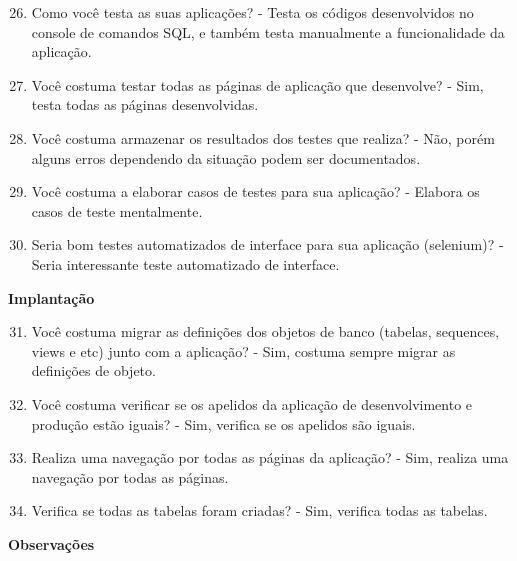 \begin{apendicesenv}
\begin{enumerate}
	\setcounter{enumi}{25}
	\item Como você testa as suas aplicações?\newline
	- Testa os códigos desenvolvidos no console de comandos SQL, e também testa manualmente a funcionalidade da aplicação.
	\item Você costuma testar todas as páginas de aplicação que desenvolve?\newline
	- Sim, testa todas as páginas desenvolvidas.
	\item Você costuma armazenar os resultados dos testes que realiza?\newline
	- Não, porém alguns erros dependendo da situação podem ser documentados.
	\item Você costuma a elaborar casos de testes para sua aplicação?\newline
	- Elabora os casos de teste mentalmente.
	\item Seria bom testes automatizados de interface para sua aplicação (selenium)?\newline
	- Seria interessante teste automatizado de interface.
\end{enumerate}

\textbf{Implantação}

\begin{enumerate}
	\setcounter{enumi}{30}
	\item Você costuma migrar as definições dos objetos de banco (tabelas, sequences, views e
	etc) junto com a aplicação?\newline
	- Sim, costuma sempre migrar as definições de objeto.
	\item Você costuma verificar se os apelidos da aplicação de desenvolvimento e produção
	estão iguais?\newline
	- Sim, verifica se os apelidos são iguais.
	\item Realiza uma navegação por todas as páginas da aplicação?\newline
	- Sim, realiza uma navegação por todas as páginas.
	\item Verifica se todas as tabelas foram criadas?\newline
	- Sim, verifica todas as tabelas.
\end{enumerate}

\textbf{Observações}


\end{apendicesenv}
